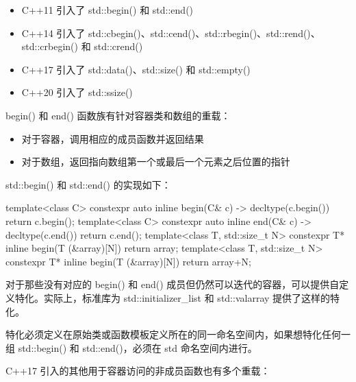 \begin{itemize}
\item
C++11 引入了 std::begin() 和 std::end()

\item
C++14 引入了 std::cbegin()、std::cend()、std::rbegin()、std::rend()、std::crbegin() 和 std::crend()

\item
C++17 引入了 std::data()、std::size() 和 std::empty()

\item
C++20 引入了 std::ssize()
\end{itemize}

begin() 和 end() 函数族有针对容器类和数组的重载：

\begin{itemize}
\item
对于容器，调用相应的成员函数并返回结果

\item
对于数组，返回指向数组第一个或最后一个元素之后位置的指针
\end{itemize}

std::begin() 和 std::end() 的实现如下：

\begin{cpp}
template<class C>
constexpr auto inline begin(C& c) -> decltype(c.begin())
{
    return c.begin();
}
template<class C>
constexpr auto inline end(C& c) -> decltype(c.end())
{
    return c.end();
}
template<class T, std::size_t N>
constexpr T* inline begin(T (&array)[N])
{
    return array;
}
template<class T, std::size_t N>
constexpr T* inline begin(T (&array)[N])
{
    return array+N;
}
\end{cpp}

对于那些没有对应的 begin() 和 end() 成员但仍然可以迭代的容器，可以提供自定义特化。实际上，标准库为 std::initializer\_list 和 std::valarray 提供了这样的特化。

\begin{myTip}
特化必须定义在原始类或函数模板定义所在的同一命名空间内，如果想特化任何一组 std::begin() 和 std::end()，必须在 std 命名空间内进行。
\end{myTip}

C++17 引入的其他用于容器访问的非成员函数也有多个重载：

